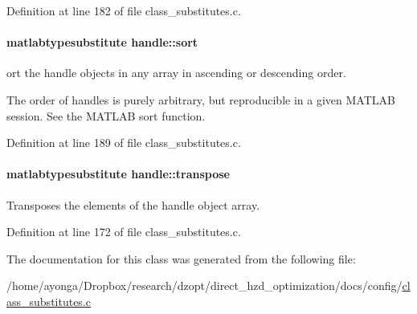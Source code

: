 Definition at line 182 of file class\+\_\+substitutes.\+c.

\paragraph[{\texorpdfstring{sort}{sort}}]{\setlength{\rightskip}{0pt plus 5cm}matlabtypesubstitute handle\+::sort}\hypertarget{classhandle_ad11b0be4c173a9d31122c1298eb96a97}{}\label{classhandle_ad11b0be4c173a9d31122c1298eb96a97}


ort the handle objects in any array in ascending or descending order. 

The order of handles is purely arbitrary, but reproducible in a given M\+A\+T\+L\+AB session. See the M\+A\+T\+L\+AB sort function. 

Definition at line 189 of file class\+\_\+substitutes.\+c.

\paragraph[{\texorpdfstring{transpose}{transpose}}]{\setlength{\rightskip}{0pt plus 5cm}matlabtypesubstitute handle\+::transpose}\hypertarget{classhandle_acd9b55f206750374c4dfca508cfff084}{}\label{classhandle_acd9b55f206750374c4dfca508cfff084}


Transposes the elements of the handle object array. 



Definition at line 172 of file class\+\_\+substitutes.\+c.



The documentation for this class was generated from the following file\+:\begin{DoxyCompactItemize}
\item 
/home/ayonga/\+Dropbox/research/dzopt/direct\+\_\+hzd\+\_\+optimization/docs/config/\hyperlink{class__substitutes_8c}{class\+\_\+substitutes.\+c}\end{DoxyCompactItemize}
